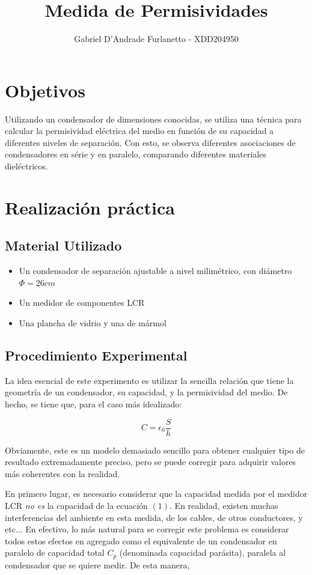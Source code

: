 \documentclass[a4paper,12pt]{article}
\begin{document}
\title{Medida de Permisividades}

\author{Gabriel D'Andrade Furlanetto - XDD204950}
\date{}
\maketitle
\section{Objetivos}
Utilizando un condensador de dimensiones conocidas, se utiliza una técnica para calcular la permisividad eléctrica del medio en función de su capacidad a diferentes niveles de separación. Con esto, se observa diferentes asociaciones de condensadores en série y en paralelo, comparando diferentes materiales dieléctricos. 
\section{Realización práctica}
\subsection{Material Utilizado}
\begin{itemize}
    \item Un condensador de separación ajustable a nivel milimétrico, con diámetro $\Phi = 26cm$
    \item Un medidor de componentes LCR
    \item Una plancha de vidrio y una de mármol
\end{itemize}

\subsection{Procedimiento Experimental}
La idea esencial de este experimento es utilizar la sencilla relación que tiene la geometría de un condensador, su capacidad, y la permisividad del medio. De hecho, se tiene que, para el caso más idealizado:

\begin{equation}
    C = \epsilon_0 \frac{S}{h}
\end{equation}

Obviamente, este es un modelo demasiado sencillo para obtener cualquier tipo de resultado extremadamente preciso, pero se puede corregir para adquirir valores más coherentes con la realidad. 

En primero lugar, es necesario considerar que la capacidad medida por el medidor LCR \textit{no es} la capacidad de la ecuación $(1)$. En realidad, existen muchas interferencias del ambiente en esta medida, de los cables, de otros conductores, y etc... En efectivo, lo más natural para se corregir este problema es considerar todos estos efectos en agregado como el equivalente de un condensador en paralelo de capacidad total $C_p$ (denominada capacidad parásita), paralela al condensador que se quiere medir. De esta manera,
\end{document}
